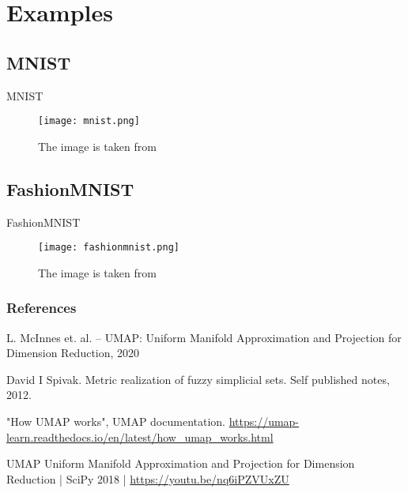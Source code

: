\documentclass{beamer}
\theoremstyle{named}
\begin{document}
\section{Examples}

\subsection{MNIST}

\begin{frame}{MNIST}
		\begin{figure}[htp]
		\centering
		\texttt{[image: mnist.png]}
		\caption{The image is taken from \cite{umap}}
	\end{figure}
\end{frame}

\subsection{FashionMNIST}

\begin{frame}{FashionMNIST}
	\begin{figure}[htp]
		\centering
		\texttt{[image: fashionmnist.png]}
		\caption{The image is taken from \cite{docs}}
	\end{figure}
\end{frame}


\begin{frame}
\frametitle{References}
\begin{thebibliography}{9}
	 L. McInnes et. al. -- UMAP: Uniform Manifold
	Approximation and Projection for
	Dimension Reduction, 2020
	
	David I Spivak. Metric realization of fuzzy simplicial sets. Self published notes, 2012.
	
	"How UMAP works", UMAP documentation. \url{https://umap-learn.readthedocs.io/en/latest/how_umap_works.html}

	UMAP Uniform Manifold Approximation and Projection for Dimension Reduction | SciPy 2018 | \url{https://youtu.be/nq6iPZVUxZU}
\end{thebibliography}
\end{frame}
\end{document}
